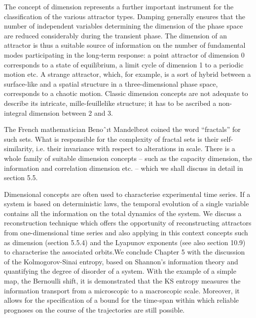 \documentclass[12pt]{article}
\begin{document}
\hfill


The concept of dimension represents a further important instrument for the classification
of the various attractor types. Damping generally ensures that the number
of independent variables determining the dimension of the phase space are reduced
considerably during the transient phase. The dimension of an attractor is thus a
suitable source of information on the number of fundamental modes participating
in the long-term response: a point attractor of dimension 0 corresponds to a state
of equilibrium, a limit cycle of dimension 1 to a periodic motion etc. A strange
attractor, which, for example, is a sort of hybrid between a surface-like and a spatial
structure in a three-dimensional phase space, corresponds to a chaotic motion.
Classic dimension concepts are not adequate to describe its intricate, mille-feuillelike
structure; it has to be ascribed a non-integral dimension between 2 and 3.

The French mathematician Benoˆıt Mandelbrot coined the word “fractals” for such
sets. What is responsible for the complexity of fractal sets is their self-similarity,
i.e. their invariance with respect to alterations in scale. There is a whole family of
suitable dimension concepts – such as the capacity dimension, the information and
correlation dimension etc. – which we shall discuss in detail in section 5.5.

\hfill

Dimensional concepts are often used to characterise experimental time series. If a
system is based on deterministic laws, the temporal evolution of a single variable
contains all the information on the total dynamics of the system. We discuss a
reconstruction technique which offers the opportunity of reconstructing attractors
from one-dimensional time series and also applying in this context concepts such
as dimension (section 5.5.4) and the Lyapunov exponents (see also section 10.9) to
characterise the associated orbits.We conclude Chapter 5 with the discussion of the
Kolmogorov-Sinai entropy, based on Shannon’s information theory and quantifying
the degree of disorder of a system. With the example of a simple map, the Bernoulli
shift, it is demonstrated that the KS entropy measures the information transport
from a microscopic to a macroscopic scale. Moreover, it allows for the specification
of a bound for the time-span within which reliable prognoses on the course of the
trajectories are still possible.

\hfill
\end{document}
